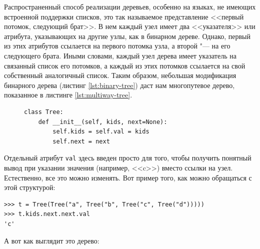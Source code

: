 Распространенный способ реализации деревьев, особенно на языках, не имеющих встроенной поддержки списков, это так называемое представление <<первый потомок, следующий брат>>. В нем каждый узел имеет два <<указателя>> или атрибута, указывающих на другие узлы, как в бинарном дереве. Однако, первый из этих атрибутов ссылается на первого потомка узла, а второй "--- на его следующего брата. Иными словами, каждый узел дерева имеет указатель на связанный список его потомков, а каждый из этих потомков ссылается на свой собственный аналогичный список. Таким образом, небольшая модификация бинарного дерева (листинг \ref{lst:binary-tree}) даст нам многопутевое дерево, показанное в листинге \ref{lst:multiway-tree}.

\begin{figure}[h]
\begin{lstlisting}[caption={Класс многопутевого дерева}, label={lst:multiway-tree}]
class Tree:
	def __init__(self, kids, next=None):
		self.kids = self.val = kids
		self.next = next
\end{lstlisting}
\end{figure}

Отдельный атрибут \texttt{val} здесь введен просто для того, чтобы получить понятный вывод при указании значения (например, <<c>>) вместо ссылки на узел. Естественно, все это можно изменять. Вот пример того, как можно обращаться с этой структурой:
\begin{lstlisting}
>>> t = Tree(Tree("a", Tree("b", Tree("c", Tree("d")))))
>>> t.kids.next.next.val
'c'
\end{lstlisting}

А вот как выглядит это дерево:
\begin{figure}[!h]
\centering
{}
\end{figure}

